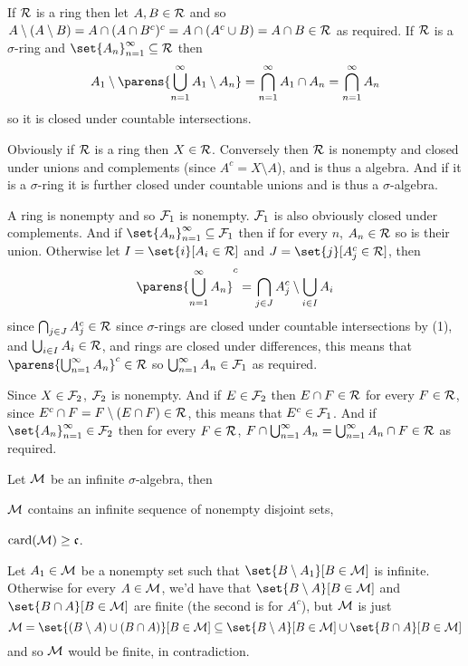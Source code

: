 \benum
    \item If ${\cal R}$ is a ring then let $A,B\in{\cal R}$ and so $A\setminus(A\setminus B)=A\cap(A\cap B^c)^c=A\cap(A^c\cup B)=A\cap B\in{\cal R}$ as required.
    If ${\cal R}$ is a $\sigma$-ring and $\set{A_n}_{n=1}^\infty\subseteq{\cal R}$ then
    $$ A_1\setminus\parens{\bigcup_{n=1}^\infty A_1\setminus A_n} = \bigcap_{n=1}^\infty A_1\cap A_n = \bigcap_{n=1}^\infty A_n $$
    so it is closed under countable intersections.
    \item Obviously if ${\cal R}$ is a ring then $X\in{\cal R}$.
    Conversely then ${\cal R}$ is nonempty and closed under unions and complements (since $A^c=X\setminus A$), and is thus a algebra.
    And if it is a $\sigma$-ring it is further closed under countable unions and is thus a $\sigma$-algebra.
    \item A ring is nonempty and so ${\cal F}_1$ is nonempty.
    ${\cal F}_1$ is also obviously closed under complements.
    And if $\set{A_n}_{n=1}^\infty\subseteq{\cal F}_1$ then if for every $n$, $A_n\in{\cal R}$ so is their union.
    Otherwise let $I=\set{i}[A_i\in{\cal R}]$ and $J=\set{j}[A_j^c\in{\cal R}]$, then
    $$ \parens{\bigcup_{n=1}^\infty A_n}^c = \bigcap_{j\in J}A_j^c\setminus\bigcup_{i\in I}A_i $$
    since $\bigcap_{j\in J}A_j^c\in{\cal R}$ since $\sigma$-rings are closed under countable intersections by (1), and $\bigcup_{i\in I}A_i\in{\cal R}$, and rings are closed under differences, this means
    that $\parens{\bigcup_{n=1}^\infty A_n}^c\in{\cal R}$ so $\bigcup_{n=1}^\infty A_n\in{\cal F}_1$ as required.
    \item Since $X\in{\cal F}_2$, ${\cal F}_2$ is nonempty.
    And if $E\in{\cal F}_2$ then $E\cap F\in{\cal R}$ for every $F\in{\cal R}$, since $E^c\cap F=F\setminus(E\cap F)\in{\cal R}$, this means that $E^c\in{\cal F}_1$.
    And if $\set{A_n}_{n=1}^\infty\in{\cal F}_2$ then for every $F\in{\cal R}$, $F\cap\bigcup_{n=1}^\infty A_n=\bigcup_{n=1}^\infty A_n\cap F\in{\cal R}$ as required.
\eenum

\bexerc

    Let ${\cal M}$ be an infinite $\sigma$-algebra, then
    \benum
        \item ${\cal M}$ contains an infinite sequence of nonempty disjoint sets,
        \item ${\rm card}({\cal M})\geq{\frak c}$.
    \eenum

\eexerc

\benum
    \item Let $A_1\in{\cal M}$ be a nonempty set such that $\set{B\setminus A_1}[B\in{\cal M}]$ is infinite.
    Otherwise for every $A\in{\cal M}$, we'd have that $\set{B\setminus A}[B\in{\cal M}]$ and $\set{B\cap A}[B\in{\cal M}]$ are finite (the second is for $A^c$), but ${\cal M}$ is just
    $$ {\cal M} = \set{(B\setminus A)\cup(B\cap A)}[B\in{\cal M}] \subseteq \set{B\setminus A}[B\in{\cal M}] \cup \set{B\cap A}[B\in{\cal M}] $$
    and so ${\cal M}$ would be finite, in contradiction.

